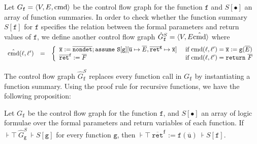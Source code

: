 
Let $G_{\mathtt{f}} = \langle V, E, \textmd{cmd} \rangle$ be the
control flow graph for the function $\mathtt{f}$ and $S[\bullet]$ an
array of function summaries. In order to check whether the function
summary $S[{\mathtt{f}}]$ for $\mathtt{f}$ specifies the relation 
between the formal parameters and return values of $\mathtt{f}$, 
we define another control flow graph
$\hat{G}_{\mathtt{f}}^S = \langle V, E \hat{\textmd{cmd}}
\rangle$ where
\begin{equation*}
  \begin{array}{rcl}
    \hat{\textmd{cmd}} (\ell, \ell') & = &
    \left\{
      \begin{array}{ll}
        \overline{\mathtt{x}} := 
        \overline{\mathtt{nondet}};
        \mathtt{assume\ S[{\mathtt{g}}]}[
        \overline{\mathtt{u}} \mapsto \overline{E},
        \mathtt{\overline{ret}^g} \mapsto \overline{\mathtt{x}}]    
        &
        \textmd{ if } \textmd{cmd} (\ell, \ell') = 
        \overline{\mathtt{x}} := \mathtt{g} (\overline{E})\\
        \mathtt{\overline{ret}^f} := \overline{F}
        &
        \textmd{ if } \textmd{cmd} (\ell, \ell') = \mathtt{return\ }
        \overline{F}
      \end{array}
    \right.
  \end{array}
\end{equation*}

The control flow graph $\hat{G}_{\mathtt{f}}^S$ replaces every
function call in $G_{\mathtt{f}}$ by instantiating a function
summary. Using the proof rule for recursive functions, we have the
following proposition:
\begin{proposition}
  Let $G_{\mathtt{f}}$ be the control flow graph for the function
  $\mathtt{f}$, and $S[\bullet]$ an array of logic formulae over the formal
  parameters and return variables of each function. If $\assert{\top}\
  \hat{G}_{\mathtt{g}}^S\ \assert{S[\mathtt{g}]}$ for every
  function $\mathtt{g}$, then $\assert{\top}\ \mathtt{\overline{ret}^f} :=
  \mathtt{f} (\overline{\mathtt{u}})\ \assert{S[\mathtt{f}]}$.
\end{proposition}

